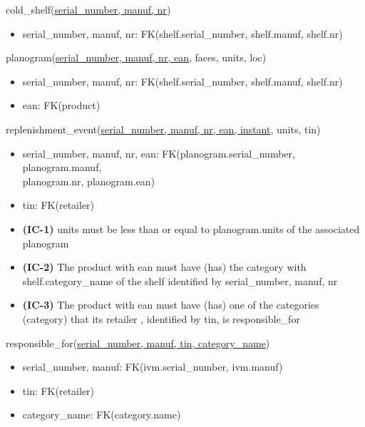 \documentclass[12pt,a4paper]{article}
\begin{document}
  \noindent
  cold\_shelf(\underline{serial\_number, manuf, nr})
  \begin{itemize}[nosep]
    \item serial\_number, manuf, nr: FK(shelf.serial\_number, shelf.manuf, shelf.nr)
  \end{itemize}

  \vspace*{10pt}

  \noindent
  planogram(\underline{serial\_number, manuf, nr, ean}, faces, units, loc)
  \begin{itemize}[nosep]
    \item serial\_number, manuf, nr: FK(shelf.serial\_number, shelf.manuf, shelf.nr)
    \item ean: FK(product)
  \end{itemize}

  \vspace*{10pt}

  \noindent
  replenishment\_event(\underline{serial\_number, manuf, nr, ean, instant}, units, tin)
  \begin{itemize}[nosep]
    \item serial\_number, manuf, nr, ean: FK(planogram.serial\_number, planogram.manuf,\\ planogram.nr, planogram.ean)
    \item tin: FK(retailer)
    \item \textsf{\textbf{(IC-1)}} units \textsf{must be less than or equal to} planogram.units \textsf{of the associated} planogram
    \item \textsf{\textbf{(IC-2)} The product with} ean \textsf{must have} (has) \textsf{the} category \textsf{with} shelf.category\_name \textsf{of the} shelf \textsf{identified by} serial\_number, manuf, nr
    \item \textsf{\textbf{(IC-3)} The product with} ean \textsf{must have} (has) \textsf{one of the categories} (category) \textsf{that its} retailer \textsf{, identified by} tin\textsf{, is} responsible\_for
    \end{itemize}

  \vspace*{10pt}

  \noindent
  responsible\_for(\underline{serial\_number, manuf, tin, category\_name})
  \begin{itemize}[nosep]
    \item serial\_number, manuf: FK(ivm.serial\_number, ivm.manuf)
    \item tin: FK(retailer)
    \item category\_name: FK(category.name)
  \end{itemize}
\end{document}
